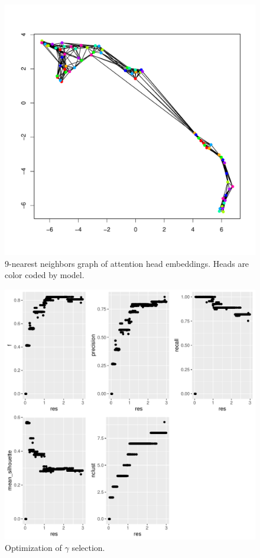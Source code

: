 \documentclass{article}
\begin{document}
\begin{figure}
	\includegraphics[width=\textwidth]{figs/knn.pdf}
	\caption{9-nearest neighbors graph of attention head embeddings. Heads are color coded by model.}
	\label{}
\end{figure}

\begin{figure}
	\includegraphics[width=\textwidth]{figs/optimization.pdf}
	\caption{Optimization of $\gamma$ selection.}
	\label{}
\end{figure}
\end{document}
